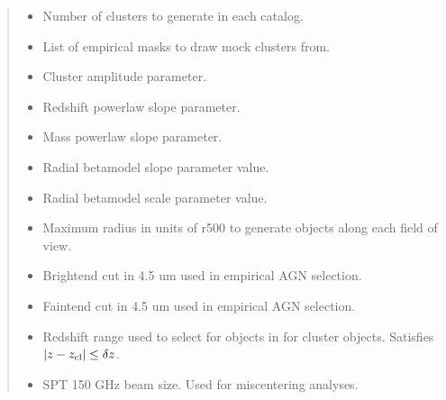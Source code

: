 \documentclass[letterpaper,12pt,english]{sphinxmanual}
\begin{document}
\begin{fulllineitems}
\begin{fulllineitems}
\begin{quote}
\begin{description}
\begin{itemize}
\item {} 
\sphinxAtStartPar
{} \textendash{} Number of clusters to generate in each catalog.

\item {} 
\sphinxAtStartPar
{} \textendash{} List of empirical masks to draw mock clusters from.

\item {} 
\sphinxAtStartPar
{} \textendash{} Cluster amplitude parameter.

\item {} 
\sphinxAtStartPar
{} \textendash{} Redshift power\sphinxhyphen{}law slope parameter.

\item {} 
\sphinxAtStartPar
{} \textendash{} Mass power\sphinxhyphen{}law slope parameter.

\item {} 
\sphinxAtStartPar
{} \textendash{} Radial beta\sphinxhyphen{}model slope parameter value.

\item {} 
\sphinxAtStartPar
{} \textendash{} Radial beta\sphinxhyphen{}model scale parameter value.

\item {} 
\sphinxAtStartPar
{} \textendash{} Maximum radius in units of r500 to generate objects along each field of view.

\item {} 
\sphinxAtStartPar
{} \textendash{} Bright\sphinxhyphen{}end cut in 4.5 um used in empirical AGN selection.

\item {} 
\sphinxAtStartPar
{} \textendash{} Faint\sphinxhyphen{}end cut in 4.5 um used in empirical AGN selection.

\item {} 
\sphinxAtStartPar
{} \textendash{} Redshift range used to select for objects in  for cluster objects. Satisfies
\(|z - z_{\rm cl}| \leq \delta z\).

\item {} 
\sphinxAtStartPar
{} \textendash{} SPT 150 GHz beam size. Used for miscentering analyses.


\end{itemize}
\end{description}
\end{quote}
\end{fulllineitems}
\end{fulllineitems}
\end{document}
